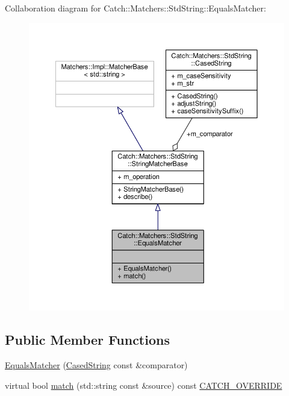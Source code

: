 Collaboration diagram for Catch\-:\-:Matchers\-:\-:Std\-String\-:\-:Equals\-Matcher\-:
\nopagebreak
\begin{figure}[H]
\begin{center}
\leavevmode
\includegraphics[width=350pt]{struct_catch_1_1_matchers_1_1_std_string_1_1_equals_matcher__coll__graph}
\end{center}
\end{figure}
\subsection*{Public Member Functions}
\begin{DoxyCompactItemize}
\item 
\hyperlink{struct_catch_1_1_matchers_1_1_std_string_1_1_equals_matcher_ab740f1fb2310e9fe3fed5134d4c7e4c8}{Equals\-Matcher} (\hyperlink{struct_catch_1_1_matchers_1_1_std_string_1_1_cased_string}{Cased\-String} const \&comparator)
\item 
virtual bool \hyperlink{struct_catch_1_1_matchers_1_1_std_string_1_1_equals_matcher_a2aeaac3c0efb8422643cd1b155256213}{match} (std\-::string const \&source) const \hyperlink{catch_8hpp_a8ecdce4d3f57835f707915ae831eb847}{C\-A\-T\-C\-H\-\_\-\-O\-V\-E\-R\-R\-I\-D\-E}
\end{DoxyCompactItemize}
